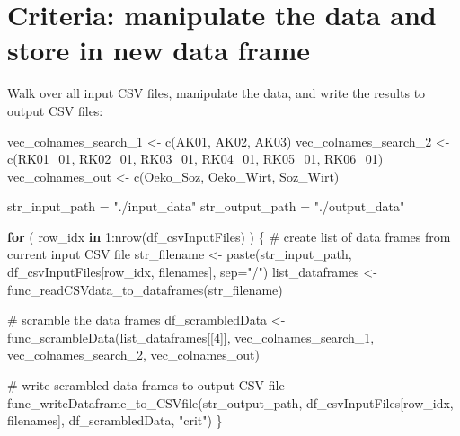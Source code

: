 \documentclass[
]{article}
\newenvironment{Shaded}{\begin{snugshade}}{\end{snugshade}}
\newcommand{\AttributeTok}[1]{\textcolor[rgb]{0.00,0.34,0.68}{#1}}
\newcommand{\CommentTok}[1]{\textcolor[rgb]{0.54,0.53,0.53}{#1}}
\newcommand{\ControlFlowTok}[1]{\textcolor[rgb]{0.12,0.11,0.11}{\textbf{#1}}}
\newcommand{\DecValTok}[1]{\textcolor[rgb]{0.69,0.50,0.00}{#1}}
\newcommand{\FunctionTok}[1]{\textcolor[rgb]{0.39,0.29,0.61}{#1}}
\newcommand{\NormalTok}[1]{\textcolor[rgb]{0.12,0.11,0.11}{#1}}
\newcommand{\OtherTok}[1]{\textcolor[rgb]{0.00,0.43,0.16}{#1}}
\newcommand{\SpecialCharTok}[1]{\textcolor[rgb]{0.24,0.68,0.91}{#1}}
\newcommand{\StringTok}[1]{\textcolor[rgb]{0.75,0.01,0.01}{#1}}
\begin{document}
\hypertarget{criteria-manipulate-the-data-and-store-in-new-data-frame}{%
\section{Criteria: manipulate the data and store in new data
frame}\label{criteria-manipulate-the-data-and-store-in-new-data-frame}}

Walk over all input CSV files, manipulate the data, and write the
results to output CSV files:

\begin{Shaded}
\begin{Highlighting}[]
\NormalTok{vec\_colnames\_search\_1 }\OtherTok{\textless{}{-}} \FunctionTok{c}\NormalTok{(}\StringTok{\textquotesingle{}AK01\textquotesingle{}}\NormalTok{, }\StringTok{\textquotesingle{}AK02\textquotesingle{}}\NormalTok{, }\StringTok{\textquotesingle{}AK03\textquotesingle{}}\NormalTok{)}
\NormalTok{vec\_colnames\_search\_2 }\OtherTok{\textless{}{-}} \FunctionTok{c}\NormalTok{(}\StringTok{\textquotesingle{}RK01\_01\textquotesingle{}}\NormalTok{, }\StringTok{\textquotesingle{}RK02\_01\textquotesingle{}}\NormalTok{, }\StringTok{\textquotesingle{}RK03\_01\textquotesingle{}}\NormalTok{, }\StringTok{\textquotesingle{}RK04\_01\textquotesingle{}}\NormalTok{, }\StringTok{\textquotesingle{}RK05\_01\textquotesingle{}}\NormalTok{, }\StringTok{\textquotesingle{}RK06\_01\textquotesingle{}}\NormalTok{)}
\NormalTok{vec\_colnames\_out }\OtherTok{\textless{}{-}} \FunctionTok{c}\NormalTok{(}\StringTok{\textquotesingle{}Oeko\_Soz\textquotesingle{}}\NormalTok{, }\StringTok{\textquotesingle{}Oeko\_Wirt\textquotesingle{}}\NormalTok{, }\StringTok{\textquotesingle{}Soz\_Wirt\textquotesingle{}}\NormalTok{)}

\NormalTok{str\_input\_path }\OtherTok{=} \StringTok{"./input\_data"}
\NormalTok{str\_output\_path }\OtherTok{=} \StringTok{"./output\_data"}

\ControlFlowTok{for}\NormalTok{ ( row\_idx }\ControlFlowTok{in} \DecValTok{1}\SpecialCharTok{:}\FunctionTok{nrow}\NormalTok{(df\_csvInputFiles) ) \{}
  \CommentTok{\# create list of data frames from current input CSV file}
\NormalTok{  str\_filename }\OtherTok{\textless{}{-}} \FunctionTok{paste}\NormalTok{(str\_input\_path, df\_csvInputFiles[row\_idx, filenames], }\AttributeTok{sep=}\StringTok{"/"}\NormalTok{)}
\NormalTok{  list\_dataframes }\OtherTok{\textless{}{-}} \FunctionTok{func\_readCSVdata\_to\_dataframes}\NormalTok{(str\_filename)}
  
  \CommentTok{\# scramble the data frames}
\NormalTok{  df\_scrambledData }\OtherTok{\textless{}{-}} \FunctionTok{func\_scrambleData}\NormalTok{(list\_dataframes[[}\DecValTok{4}\NormalTok{]], vec\_colnames\_search\_1, vec\_colnames\_search\_2, vec\_colnames\_out)}
  
  \CommentTok{\# write scrambled data frames to output CSV file}
  \FunctionTok{func\_writeDataframe\_to\_CSVfile}\NormalTok{(str\_output\_path, df\_csvInputFiles[row\_idx, filenames], df\_scrambledData, }\StringTok{"crit"}\NormalTok{)}
\NormalTok{\}}
\end{Highlighting}
\end{Shaded}
\end{document}
